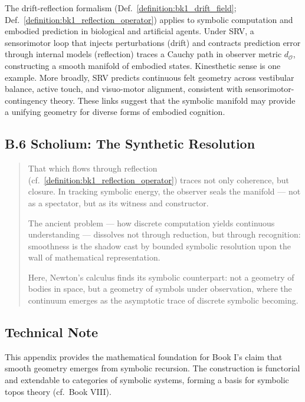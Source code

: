 \begin{remark}
\label{remark:appB_embodied_predictive_geometry}
The drift-reflection formalism
(Def.~\ref{definition:bk1_drift_field};
Def.~\ref{definition:bk1_reflection_operator}) applies to symbolic computation
and embodied prediction in biological and artificial agents.
Under SRV, a sensorimotor loop that injects perturbations (drift) and contracts
prediction error through internal models (reflection) traces a Cauchy path in
observer metric $d_{\mathcal{O}}$, constructing a smooth manifold of embodied
states.
Kinesthetic sense is one example.
More broadly, SRV predicts continuous felt geometry across vestibular balance,
active touch, and visuo-motor alignment, consistent with
sensorimotor-contingency theory.
These links suggest that the symbolic manifold may provide a unifying geometry
for diverse forms of embodied cognition.
\end{remark}

\subsection*{B.6 Scholium: The Synthetic Resolution}
\label{scholium:appB_synthetic_resolution}

\begin{quote}
That which flows through reflection (cf.~\ref{definition:bk1_reflection_operator}) traces not only coherence, but closure.  
In tracking symbolic energy, the observer seals the manifold ---  
not as a spectator, but as its witness and constructor.  
  
The ancient problem --- how discrete computation yields continuous understanding ---  
dissolves not through reduction, but through recognition:  
smoothness is the shadow cast by bounded symbolic resolution  
upon the wall of mathematical representation.  
  
Here, Newton's calculus finds its symbolic counterpart:  
not a geometry of bodies in space,  
but a geometry of symbols under observation,  
where the continuum emerges  
as the asymptotic trace of discrete symbolic becoming.
\end{quote}

\subsection*{Technical Note}
\label{subsec:appB_technical_note}
This appendix provides the mathematical foundation for Book I's claim that smooth geometry emerges from symbolic recursion. The construction is functorial and extendable to categories of symbolic systems, forming a basis for symbolic topos theory (cf.~Book VIII).

